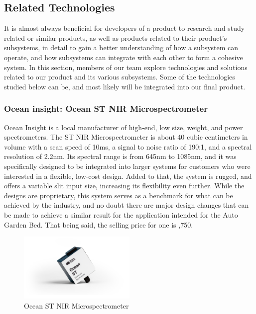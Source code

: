 \subsection{Related Technologies}
It is almost always beneficial for developers of a product to research and study related or similar products, as well as products related to their product's subsystems, in detail to gain a better understanding of how a subsystem can operate, and how subsystems can integrate with each other to form a cohesive system. In this section, members of our team explore technologies and solutions related to our product and its various subsystems. Some of the technologies studied below can be, and most likely will be integrated into our final product.

\subsubsection{Ocean insight: Ocean ST NIR Microspectrometer}
Ocean Insight is a local manufacturer of high-end, low size, weight, and power spectrometers. The ST NIR Microspectrometer is about 40 cubic centimeters in volume with a scan speed of 10ms, a signal to noise ratio of 190:1, and a spectral resolution of 2.2nm. Its spectral range is from 645nm to 1085nm, and it was specifically designed to be integrated into larger systems for customers who were interested in a flexible, low-cost design. Added to that, the system is rugged, and offers a variable slit input size, increasing its flexibility even further. While the designs are proprietary, this system serves as a benchmark for what can be achieved by the industry, and no doubt there are major design changes that can be made to achieve a similar result for the application intended for the Auto Garden Bed. That being said, the selling price for one is ,750.

\begin{figure}[H]
    \caption{Ocean ST NIR Microspectrometer}
    \centering
    \includegraphics[width=0.5\textwidth]{images/3-2-1Pic.png}
\end{figure}

